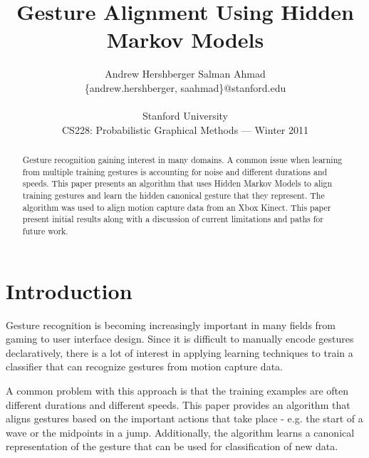 \documentclass{article}
\title{Gesture Alignment Using Hidden Markov Models}
\author{
Andrew Hershberger
\quad Salman Ahmad \\
\{andrew.hershberger, saahmad\}@stanford.edu
\\\\
Stanford University\\
CS228: Probabilistic Graphical Methods --- Winter 2011\\
}
\begin{document}
\maketitle

\begin{abstract}

Gesture recognition gaining interest in many domains. A common issue when
learning from multiple training gestures is accounting for noise and different
durations and speeds. This paper presents an algorithm that uses Hidden Markov
Models to align training gestures and learn the hidden canonical gesture that
they represent. The algorithm was used to align motion capture data from an
Xbox Kinect. This paper present initial results along with a discussion of
current limitations and paths for future work.

\end{abstract}

\section{Introduction}

Gesture recognition is becoming increasingly important in many fields from
gaming to user interface design. Since it is difficult to manually encode
gestures declaratively, there is a lot of interest in applying learning
techniques to train a classifier that can recognize gestures from motion
capture data.

A common problem with this approach is that the training examples are often
different durations and different speeds. This paper provides an algorithm
that aligns gestures based on the important actions that take place - e.g. the
start of a wave or the midpoints in a jump. Additionally, the algorithm
learns a canonical representation of the gesture that can be used for
classification of new data.
\end{document}
